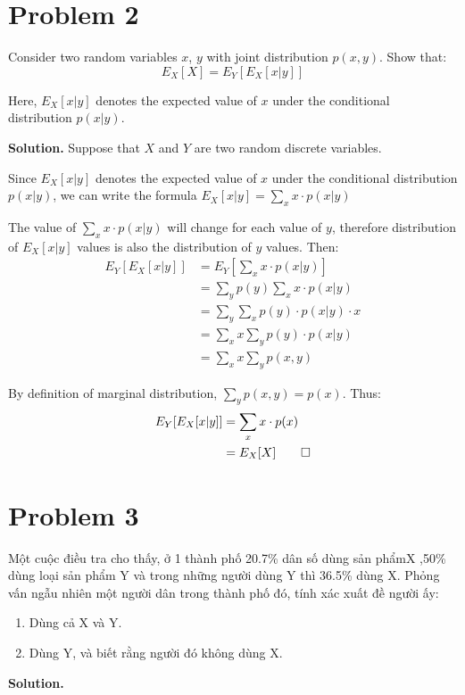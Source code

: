 \documentclass[a4paper, 12pt]{article}  %
\begin{document}
\section{Problem 2}

Consider two random variables $x$, $y$ with joint distribution $p(x, y)$. Show that:
\[E_X [X] = E_Y [E_X [x|y]]\]

Here, $E_X [x|y]$ denotes the expected value of $x$ under the conditional distribution $p(x|y)$. 

\textbf{Solution.}
Suppose that $X$ and $Y$ are two random discrete variables.

Since $E_X [x|y]$ denotes the expected value of $x$ under the conditional distribution $p(x|y)$, we can write the formula $\displaystyle E_X [x|y] = \sum_{x} x \cdot p(x | y)$ 

The value of $\sum_{x} x \cdot p(x | y)$ will change for each value of $y$, therefore distribution of $E_X [x|y]$ values is also the distribution of $y$ values. Then:
\begin{align*}
    E_Y [E_X [x | y]] &= E_Y [\sum_{x} x \cdot p(x | y)] \\
    &= \sum_{y} p(y) \sum_{x} x \cdot p(x | y) \\
    &= \sum_{y} \sum_{x} p(y) \cdot p(x|y) \cdot x \\
    &= \sum_{x} x \sum_{y} p(y) \cdot p(x|y) \\
    &= \sum_{x} x \sum_{y} p(x, y)
\end{align*}

By definition of marginal distribution, $\sum_{y} p(x, y) = p(x)$. Thus:
\begin{align*}
    E_Y [E_X [x | y]] &= \sum_{x} x \cdot p(x) \\
    &= E_X [X] \qed
\end{align*}

\section{Problem 3}

Một cuộc điều tra cho thấy, ở 1 thành phố 20.7\% dân số dùng sản phẩmX ,50\% dùng loại sản phẩm Y và trong những người dùng Y thì 36.5\% dùng X. Phỏng vấn ngẫu nhiên một người dân trong thành phố đó, tính xác xuất đề người ấy:

\begin{enumerate}[label=(\alph*)]
    \item Dùng cả X và Y.
    \item Dùng Y, và biết rằng người đó không dùng X.
\end{enumerate}
\textbf{Solution.}
\end{document}
